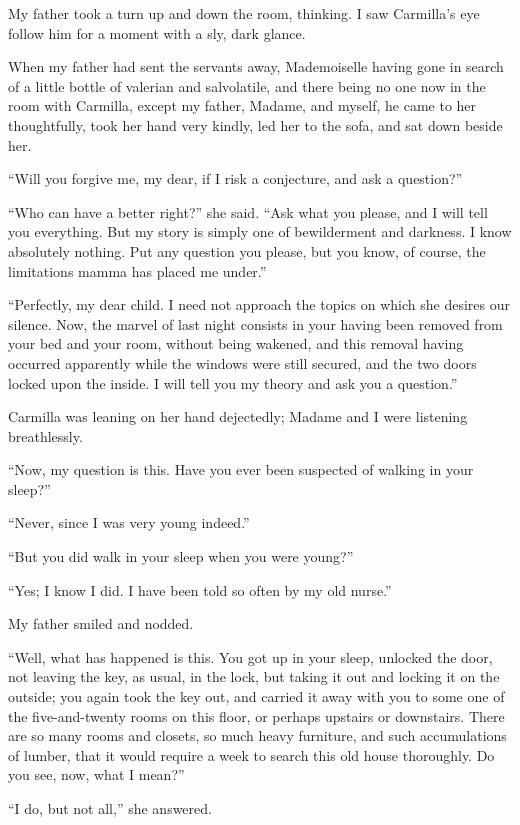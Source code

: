 \documentclass[11pt,twoside,makeidx,hidelinks,]{memoir}
\begin{document}
My father took a turn up and down the room, thinking. I saw Carmilla's
eye follow him for a moment with a sly, dark glance.

When my father had sent the servants away, Mademoiselle having gone in
search of a little bottle of valerian and salvolatile, and there being
no one now in the room with Carmilla, except my father, Madame, and
myself, he came to her thoughtfully, took her hand very kindly, led her
to the sofa, and sat down beside her.

``Will you forgive me, my dear, if I risk a conjecture, and ask a
question?''

``Who can have a better right?'' she said. ``Ask what you please, and I
will tell you everything. But my story is simply one of bewilderment and
darkness. I know absolutely nothing. Put any question you please, but
you know, of course, the limitations mamma has placed me under.''

``Perfectly, my dear child. I need not approach the topics on which she
desires our silence. Now, the marvel of last night consists in your
having been removed from your bed and your room, without being wakened,
and this removal having occurred apparently while the windows were still
secured, and the two doors locked upon the inside. I will tell you my
theory and ask you a question.''

Carmilla was leaning on her hand dejectedly; Madame and I were
listening breathlessly.

``Now, my question is this. Have you ever been suspected of walking in
your sleep?''

``Never, since I was very young indeed.''

``But you did walk in your sleep when you were young?''

``Yes; I know I did. I have been told so often by my old nurse.''

My father smiled and nodded.

``Well, what has happened is this. You got up in your sleep, unlocked the
door, not leaving the key, as usual, in the lock, but taking it out and
locking it on the outside; you again took the key out, and carried it
away with you to some one of the five-and-twenty rooms on this floor, or
perhaps upstairs or downstairs. There are so many rooms and closets, so
much heavy furniture, and such accumulations of lumber, that it would
require a week to search this old house thoroughly. Do you see, now,
what I mean?''

``I do, but not all,'' she answered.
\end{document}
